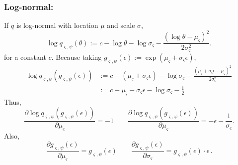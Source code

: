 \documentclass{article}
\begin{document}
\subsubsection*{Log-normal:}
If $q$ is log-normal with location $\mu$ and scale $\sigma$,
\[
\log q_{\varsigma, \psi}(\theta) := c - \log \theta - \log \sigma_\varsigma - \frac{(\log \theta - \mu_\varsigma)^2}{2 \sigma_\varsigma^2}.
\]
for a constant $c$.
Because taking $g_{\varsigma,\psi}(\epsilon) := \exp(\mu_\varsigma + \sigma_\varsigma \epsilon)$,
\begin{align*}
\log q_{\varsigma, \psi}(g_{\varsigma,\psi}(\epsilon))
& := c - (\mu_\varsigma + \sigma_\varsigma \epsilon)
    - \log \sigma_\varsigma
    - \frac{(\mu_\varsigma + \sigma_\varsigma \epsilon - \mu_\varsigma)^2}{2 \sigma_\varsigma^2} \\
 & := c - \mu_\varsigma - \sigma_\varsigma \epsilon - \log \sigma_\varsigma - \frac{1}{2}
\end{align*}
Thus,
\begin{equation}
    \frac{\partial \log q_{\varsigma, \psi}(g_{\varsigma,\psi}(\epsilon))}{\partial \mu_\varsigma} = -1
    \qquad
    \frac{\partial \log q_{\varsigma, \psi}(g_{\varsigma,\psi}(\epsilon))}{\partial \mu_\varsigma} = -\epsilon - \frac{1}{\sigma_\varsigma}.
\end{equation}
Also,
\begin{equation}
    \frac{\partial g_{\varsigma,\psi}(\epsilon)}{\partial \mu_\varsigma} = g_{\varsigma,\psi}(\epsilon)
    \qquad
    \frac{\partial g_{\varsigma,\psi}(\epsilon)}{\partial \sigma_\varsigma} = g_{\varsigma,\psi}(\epsilon) \cdot \epsilon \, .
\end{equation}


\nocite{vbpi}



\end{document}
